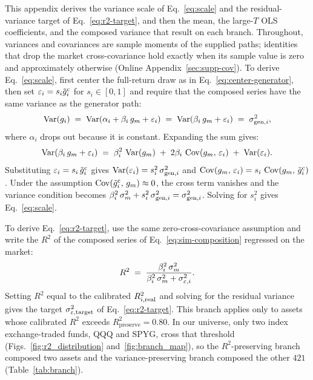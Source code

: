 This appendix derives the variance scale of Eq.~\eqref{eq:scale} and
the residual-variance target of Eq.~\eqref{eq:r2-target}, and then the
mean, the large-$T$ OLS coefficients, and the composed variance that
result on each branch. Throughout, variances and covariances are
sample moments of the supplied paths; identities that drop the market
cross-covariance hold exactly when its sample value is zero and
approximately otherwise (Online Appendix~\ref{sec:supp-cov}). To
derive Eq.~\eqref{eq:scale}, first center the full-return
draw as in Eq.~\eqref{eq:center-generator}, then set
$\varepsilon_i=s_i\tilde{g}_i^{\mathrm c}$ for $s_i\in[0,1]$ and require
that the composed series have the same variance as the generator
path:
\begin{equation}
  \operatorname{Var}(g_i) \;=\; \operatorname{Var}(\alpha_i + \beta_i\, g_m + \varepsilon_i)
            \;=\; \operatorname{Var}(\beta_i\, g_m + \varepsilon_i)
            \;=\; \sigma_{\mathrm{gen},i}^2,
\end{equation}
where $\alpha_i$ drops out because it is constant. Expanding the sum
gives:
\begin{equation}
  \operatorname{Var}(\beta_i\, g_m + \varepsilon_i) \;=\; \beta_i^2\, \operatorname{Var}(g_m)
  \;+\; 2 \beta_i\, \operatorname{Cov}(g_m,\, \varepsilon_i)
  \;+\; \operatorname{Var}(\varepsilon_i).
\end{equation}
Substituting $\varepsilon_i = s_i\,\tilde{g}_i^{\mathrm c}$ gives
$\operatorname{Var}(\varepsilon_i) = s_i^2\,\sigma_{\mathrm{gen},i}^2$ and
$\operatorname{Cov}(g_m,\, \varepsilon_i) = s_i\,\operatorname{Cov}(g_m,\, \tilde{g}_i^{\mathrm c})$. Under the
assumption $\operatorname{Cov}(\tilde{g}_i^{\mathrm c},\,g_m)\approx0$, the cross term vanishes and
the variance condition becomes
$\beta_i^2\, \sigma_m^2 + s_i^2\, \sigma_{\mathrm{gen},i}^2 =
\sigma_{\mathrm{gen},i}^2$. Solving for $s_i^2$ gives Eq.~\eqref{eq:scale}.

To derive Eq.~\eqref{eq:r2-target}, use the same zero-cross-covariance
assumption and write the $R^2$ of the composed series of
Eq.~\eqref{eq:sim-composition} regressed on the market:
\begin{equation}
  R^2 \;=\; \frac{\beta_i^2\, \sigma_m^2}{\beta_i^2\, \sigma_m^2 + \sigma_{\varepsilon,i}^2}.
\end{equation}
Setting $R^2$ equal to the calibrated $R^2_{i,\mathrm{real}}$ and solving for
the residual variance gives the target $\sigma_{\varepsilon,\mathrm{target}}^2$
of Eq.~\eqref{eq:r2-target}. This branch applies only to assets whose
calibrated $R^2$ exceeds $R^2_{\mathrm{preserve}} = 0.80$. In our
universe, only two index exchange-traded funds, QQQ and SPYG, cross
that threshold (Figs.~\ref{fig:r2_distribution}
and~\ref{fig:branch_map}), so the $R^2$-preserving branch composed two
assets and the variance-preserving branch composed the other $421$
(Table~\ref{tab:branch}).

